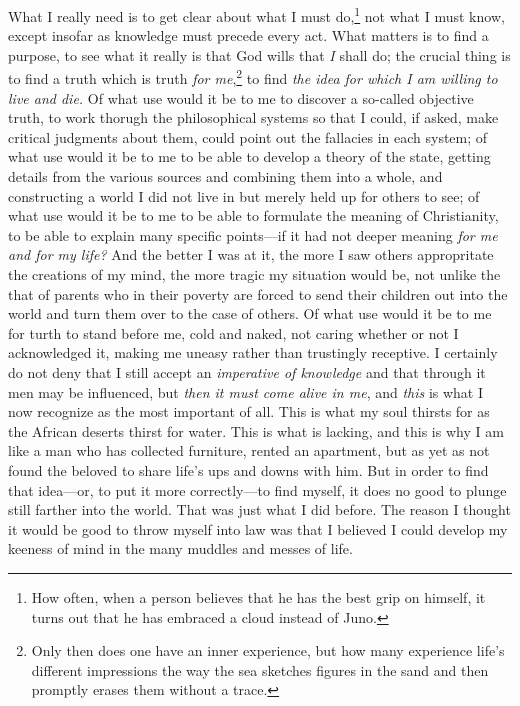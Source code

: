   What I really need is to get clear about what I must do,\footnote{
   How often, when a person believes that he has the best grip on himself, it turns out that he has embraced a cloud instead of Juno. 
 }
   not what I must know, except insofar as knowledge must precede every act. 
 What matters is to find a purpose, to see what it really is that God wills that \textit{I} shall do; the crucial thing is to find a truth which is truth \textit{for me},\footnote{
   Only then does one have an inner experience, but how many experience life's different impressions the way the sea sketches figures in the sand and then promptly erases them without a trace. 
 }
   to find \textit{the idea for which I am willing to live and die.} 
 Of what use would it be to me to discover a so-called objective truth, to work thorugh the philosophical systems so that I could, if asked, make critical judgments about them, could point out the fallacies in each system; of what use would it be to me to be able to develop a theory of the state, getting details from the various sources and combining them into a whole, and constructing a world I did not live in but merely held up for others to see; of what use would it be to me to be able to formulate the meaning of Christianity, to be able to explain many specific points---if it had not deeper meaning \textit{for me and for my life?} 
 And the better I was at it, the more I saw others appropritate the creations of my mind, the more tragic my situation would be, not unlike the that of parents who in their poverty are forced to send their children out into the world and turn them over to the case of others. 
 Of what use would it be to me for turth to stand before me, cold and naked, not caring whether or not I acknowledged it, making me uneasy rather than trustingly receptive. 
 I certainly do not deny that I still accept an \textit{imperative of knowledge} and that through it men may be influenced, but \textit{then it must come alive in me}, and \textit{this} is what I now recognize as the most important of all. 
 This is what my soul thirsts for as the African deserts thirst for water. 
 This is what is lacking, and this is why I am like a man who has collected furniture, rented an apartment, but as yet as not found the beloved to share life's ups and downs with him. 
 But in order to find that idea---or, to put it more correctly---to find myself, it does no good to plunge still farther into the world. 
 That was just what I did before. 
 The reason I thought it would be good to throw myself into law was that I believed I could develop my keeness of mind in the many muddles and messes of life. 
